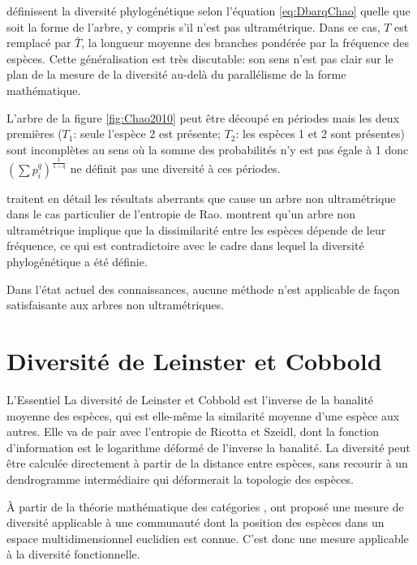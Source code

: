 \documentclass[
  11pt,
  french,
  a4paper,
  extrafontsizes,onecolumn,openright
  ]{memoir}
\newenvironment{Summary}
  {\begin{bclogo}[logo=\bctrombone, noborder=true, couleur=lightgray!50]{L'Essentiel}\parindent0pt}
  {\end{bclogo}}
\begin{document}
\normalsize

\textcite{Chao2010} définissent la diversité phylogénétique selon l'équation \eqref{eq:DbarqChao} quelle que soit la forme de l'arbre, y compris s'il n'est pas ultramétrique.
Dans ce cas, \(T\) est remplacé par \(\bar{T}\), la longueur moyenne des branches pondérée par la fréquence des espèces.
Cette généralisation est très discutable: son sens n'est pas clair sur le plan de la mesure de la diversité au-delà du parallélisme de la forme mathématique.

L'arbre de la figure \ref{fig:Chao2010} \autocite[figure 1b]{Chao2010} peut être découpé en périodes mais les deux premières (\(T_1\): seule l'espèce 2 est présente; \(T_2\): les espèces 1 et 2 sont présentes) sont incomplètes au sens où la somme des probabilités n'y est pas égale à 1 donc \({\left(\sum{p^q_i}\right)}^{\frac{1}{1-q}}\) ne définit pas une diversité à ces périodes.

\textcite{Pavoine2009} traitent en détail les résultats aberrants que cause un arbre non ultramétrique dans le cas particulier de l'entropie de Rao.
\textcite{Leinster2012} montrent qu'un arbre non ultramétrique implique que la dissimilarité entre les espèces dépende de leur fréquence, ce qui est contradictoire avec le cadre dans lequel la diversité phylogénétique a été définie.

Dans l'état actuel des connaissances, aucune méthode n'est applicable de façon satisfaisante aux arbres non ultramétriques.

\hypertarget{chap:LeinsterCobbold}{%
\chapter{Diversité de Leinster et Cobbold}\label{chap:LeinsterCobbold}}

\scriptsize

\begin{Summary}
La diversité de Leinster et Cobbold est l'inverse de la banalité moyenne
des espèces, qui est elle-même la similarité moyenne d'une espèce aux
autres. Elle va de pair avec l'entropie de Ricotta et Szeidl, dont la
fonction d'information est le logarithme déformé de l'inverse la
banalité. La diversité peut être calculée directement à partir de la
distance entre espèces, sans recourir à un dendrogramme intermédiaire
qui déformerait la topologie des espèces.
\end{Summary}

\normalsize

À partir de la théorie mathématique des catégories \autocite{Leinster2013}, \textcite{Leinster2012} ont proposé une mesure de diversité applicable à une communauté dont la position des espèces dans un espace multidimensionnel euclidien est connue.
C'est donc une mesure applicable à la diversité fonctionnelle.
\end{document}
